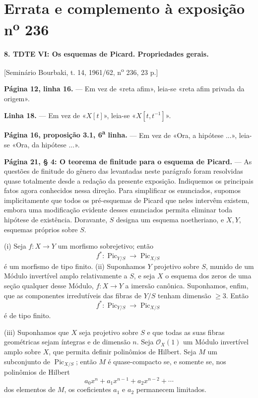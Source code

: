 \clearpage
\chapter*{Errata e complemento à exposição n\textsuperscript{o} 236}

\noindent\textbf{8. TDTE VI: Os esquemas de Picard. Propriedades gerais.}

\begin{center}
[Seminário Bourbaki, t. 14, 1961/62, n\textsuperscript{o} 236, 23 p.]
\end{center}

\noindent\textbf{Página 12, linha 16.} --- Em vez de «reta afim», leia-se
«reta afim privada da origem».

\noindent\textbf{Linha 18.} --- Em vez de «$X[t]$», leia-se
«$X[t,t^{-1}]$».

\noindent\textbf{Página 16, proposição 3.1, 6\textsuperscript{a} linha.} ---
Em vez de «Ora, a hipótese ...», leia-se «Ora, da hipótese ...».

\noindent\textbf{Página 21, § 4: O teorema de finitude para o esquema de
Picard.} --- As questões de finitude do gênero das levantadas neste parágrafo
foram resolvidas quase totalmente desde a redação da presente exposição.
Indiquemos os principais fatos agora conhecidos nessa direção. Para simplificar
os enunciados, supomos implicitamente que todos os pré-esquemas de Picard que
neles intervêm existem, embora uma modificação evidente desses enunciados
permita eliminar toda hipótese de existência. Doravante, $S$ designa um esquema
noetheriano, e $X,Y$, esquemas próprios sobre $S$.

\medskip
\noindent(i) Seja $f:X\longrightarrow Y$ um morfismo sobrejetivo; então
\[
f^*: \operatorname{Pic}_{Y/S}\longrightarrow\operatorname{Pic}_{X/S}
\]
é um morfismo de tipo finito.
\noindent(ii) Suponhamos $Y$ projetivo sobre $S$, munido de um Módulo
invertível amplo relativamente a $S$, e seja $X$ o esquema dos zeros de uma
seção qualquer desse Módulo, $f:X\longrightarrow Y$ a imersão canônica.
Suponhamos, enfim, que as componentes irredutíveis das fibras de $Y/S$ tenham
dimensão $\geq3$. Então
\[
f^*: \operatorname{Pic}_{Y/S}\longrightarrow\operatorname{Pic}_{X/S}
\]
é de tipo finito.

\noindent(iii) Suponhamos que $X$ seja projetivo sobre $S$ e que todas as suas
fibras geométricas sejam íntegras e de dimensão $n$. Seja
$\mathcal O_X(1)$ um Módulo invertível amplo sobre $X$, que permita definir
polinômios de Hilbert. Seja $M$ um subconjunto de
$\operatorname{Pic}_{X/S}$; então $M$ é quase-compacto se, e somente se, nos
polinômios de Hilbert
\[
a_0x^n+a_1x^{n-1}+a_2x^{n-2}+\cdots
\]
dos elementos de $M$, os coeficientes $a_1$ e $a_2$ permanecem limitados.


